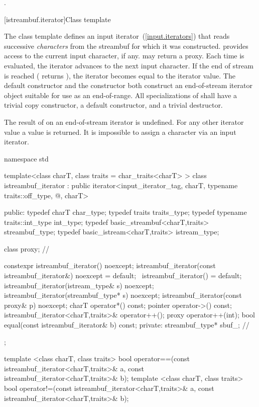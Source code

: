 \begin{itemdescr}
\pnum
\returns
{}.
\end{itemdescr}

[istreambuf.iterator]{Class template }

\pnum
The
class template
defines an input iterator~(\ref{input.iterators}) that
reads successive
\textit{characters}
from the streambuf for which it was constructed.
provides access to the current input character, if any.
\enternote {} may return a proxy. \exitnote
Each time
is evaluated, the iterator advances to the next input character.
If the end of stream is reached ( returns
),
the iterator becomes equal to the
iterator value.
The default constructor
and the constructor
both construct an end-of-stream iterator object suitable for use
as an end-of-range.
All specializations of  shall have a trivial copy
constructor, a  default constructor, and a trivial destructor.

\pnum
The result of
on an end-of-stream iterator is undefined.
%
For any other iterator value a
value is returned.
It is impossible to assign a character via an input iterator.

%
\begin{codeblock}
namespace std {
  template<class charT, class traits = char_traits<charT> >
  class istreambuf_iterator
     : public iterator<input_iterator_tag, charT,
                       typename traits::off_type, @\unspec@, charT> {
  public:
    typedef charT                         char_type;
    typedef traits                        traits_type;
    typedef typename traits::int_type     int_type;
    typedef basic_streambuf<charT,traits> streambuf_type;
    typedef basic_istream<charT,traits>   istream_type;

    class proxy;                          // \expos

    constexpr istreambuf_iterator() noexcept;
    istreambuf_iterator(const istreambuf_iterator&) noexcept = default;
    ~istreambuf_iterator() = default;
    istreambuf_iterator(istream_type& s) noexcept;
    istreambuf_iterator(streambuf_type* s) noexcept;
    istreambuf_iterator(const proxy& p) noexcept;
    charT operator*() const;
    pointer operator->() const;
    istreambuf_iterator<charT,traits>& operator++();
    proxy operator++(int);
    bool equal(const istreambuf_iterator& b) const;
  private:
    streambuf_type* sbuf_;                // \expos
  };

  template <class charT, class traits>
    bool operator==(const istreambuf_iterator<charT,traits>& a,
            const istreambuf_iterator<charT,traits>& b);
  template <class charT, class traits>
    bool operator!=(const istreambuf_iterator<charT,traits>& a,
            const istreambuf_iterator<charT,traits>& b);
}
\end{codeblock}

